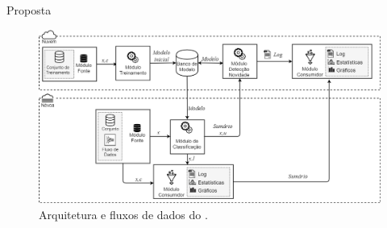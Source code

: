 \documentclass[aspectratio=43,10pt]{beamer}
\newcommand{\nota}[1]{\hspace*{-0.5cm}\textit{{\color[rgb]{1,0,0}Nota: #1}}}
\begin{document}
\begin{frame}[fragile]{Proposta}
\vspace{-0.5cm}
\begin{figure}[h]
  \centering
  \hspace*{-0.9cm}
  \includegraphics[width=1.15\textwidth]{figuras/mfog-arch-v3_pt-br.png}
  \caption{Arquitetura e fluxos de dados do \mfog.}
  \label{fig:arch}
\end{figure}
\end{frame}
\end{document}
